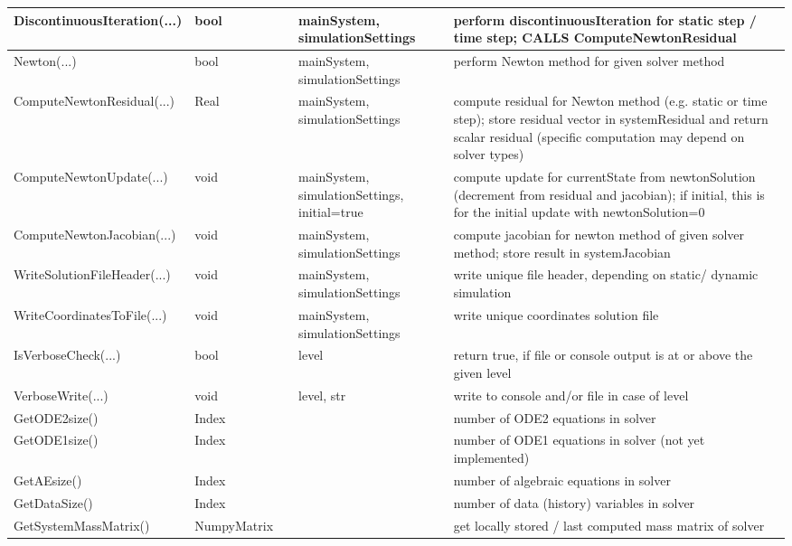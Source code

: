 \begin{center}
\begin{longtable}{| p{4.2cm} | p{2.5cm} | p{0.3cm} | p{3.0cm} | p{6cm} |}
    DiscontinuousIteration(...) &     bool &      &     mainSystem, simulationSettings &     perform discontinuousIteration for static step / time step; CALLS ComputeNewtonResidual\\ \hline
    Newton(...) &     bool &      &     mainSystem, simulationSettings &     perform Newton method for given solver method\\ \hline
    ComputeNewtonResidual(...) &     Real &      &     mainSystem, simulationSettings &     compute residual for Newton method (e.g. static or time step); store residual vector in systemResidual and return scalar residual (specific computation may depend on solver types)\\ \hline
    ComputeNewtonUpdate(...) &     void &      &     mainSystem, simulationSettings, initial=true &     compute update for currentState from newtonSolution (decrement from residual and jacobian); if initial, this is for the initial update with newtonSolution=0\\ \hline
    ComputeNewtonJacobian(...) &     void &      &     mainSystem, simulationSettings &     compute jacobian for newton method of given solver method; store result in systemJacobian\\ \hline
    WriteSolutionFileHeader(...) &     void &      &     mainSystem, simulationSettings &     write unique file header, depending on static/ dynamic simulation\\ \hline
    WriteCoordinatesToFile(...) &     void &      &     mainSystem, simulationSettings &     write unique coordinates solution file\\ \hline
    IsVerboseCheck(...) &     bool &      &     level &     return true, if file or console output is at or above the given level\\ \hline
    VerboseWrite(...) &     void &      &     level, str &     write to console and/or file in case of level\\ \hline
    GetODE2size() &     Index &      &      &     number of ODE2 equations in solver\\ \hline
    GetODE1size() &     Index &      &      &     number of ODE1 equations in solver (not yet implemented)\\ \hline
    GetAEsize() &     Index &      &      &     number of algebraic equations in solver\\ \hline
    GetDataSize() &     Index &      &      &     number of data (history) variables in solver\\ \hline
    GetSystemMassMatrix() &     NumpyMatrix &      &      &     get locally stored / last computed mass matrix of solver\\ \hline

\end{longtable}
\end{center}
